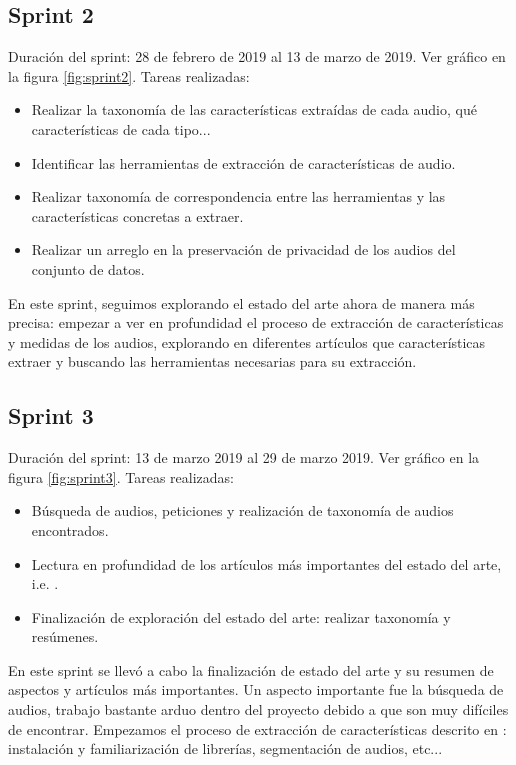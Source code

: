 \subsection{Sprint 2}
Duración del sprint: 28 de febrero de 2019 al 13 de marzo de 2019. Ver gráfico  en la figura \ref{fig:sprint2}.
Tareas realizadas:
\begin{itemize}
\item Realizar la taxonomía de las características extraídas de cada audio, qué características de cada tipo...
\item Identificar las herramientas de extracción de características de audio.
\item Realizar taxonomía de correspondencia entre las herramientas y las características concretas a extraer.
\item Realizar un arreglo en la preservación de privacidad de los audios del conjunto de datos.
\end{itemize}
En este sprint, seguimos explorando el estado del arte ahora de manera más precisa: empezar a ver en profundidad el proceso de extracción de características y medidas de los audios, explorando en diferentes artículos que características extraer y buscando las herramientas necesarias para su extracción.

\subsection{Sprint 3}
Duración del sprint: 13 de marzo 2019 al 29 de marzo 2019. Ver gráfico  en la figura \ref{fig:sprint3}.
Tareas realizadas:
\begin{itemize}
\item Búsqueda de audios, peticiones y realización de taxonomía de audios encontrados.
\item Lectura en profundidad de los artículos más importantes del estado del arte, i.e. \cite{Orz2016}.
\item Finalización de exploración del estado del arte: realizar taxonomía y resúmenes.
\end{itemize}
En este sprint se llevó a cabo la finalización de estado del arte y su resumen de aspectos y artículos más importantes. Un aspecto importante fue la búsqueda de audios, trabajo bastante arduo dentro del proyecto debido a que son muy difíciles de encontrar. Empezamos el proceso de extracción de características descrito en \cite{Orz2016}: instalación y familiarización de librerías, segmentación de audios, etc...

